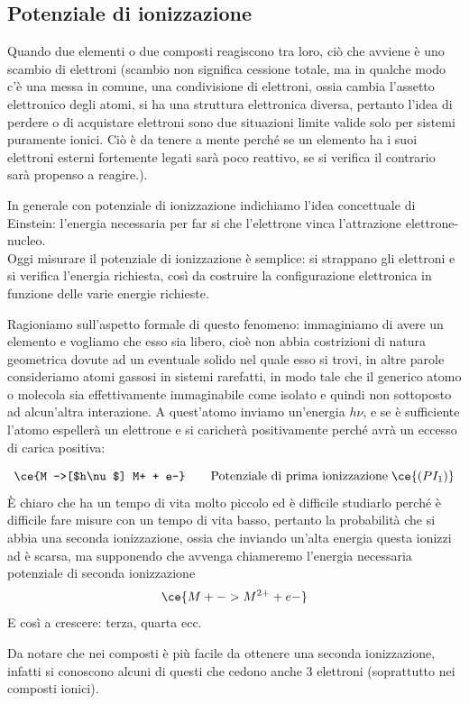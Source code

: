 \subsection{Potenziale di ionizzazione}
Quando due elementi o due composti reagiscono tra loro, ciò che avviene è uno scambio di elettroni (scambio non significa cessione totale, ma in qualche modo c'è una messa in comune, una condivisione di elettroni, ossia cambia l'assetto elettronico degli atomi, si ha una struttura elettronica diversa, pertanto l'idea di perdere o di acquistare elettroni sono due situazioni limite valide solo per sistemi puramente ionici. Ciò è da tenere a mente perché se un elemento ha i suoi elettroni esterni fortemente legati sarà poco reattivo, se si verifica il contrario sarà propenso a reagire.).

In generale con potenziale di ionizzazione indichiamo l'idea concettuale di Einstein: l'energia necessaria per far si che l'elettrone vinca l'attrazione elettrone-nucleo.\\

Oggi misurare il potenziale di ionizzazione è semplice: si strappano gli elettroni e si verifica l'energia richiesta, così da costruire la configurazione elettronica in funzione delle varie energie richieste.

Ragioniamo sull'aspetto formale di questo fenomeno: immaginiamo di avere un elemento e vogliamo che esso sia libero, cioè non abbia costrizioni di natura geometrica dovute ad un eventuale solido nel quale esso si trovi, in altre parole consideriamo atomi gassosi in sistemi rarefatti, in modo tale che il generico atomo o molecola sia effettivamente immaginabile come isolato e quindi non sottoposto ad alcun'altra interazione. A quest'atomo inviamo un'energia $h\nu$, e se è sufficiente l'atomo espellerà un elettrone e si caricherà positivamente perché avrà un eccesso di carica positiva:

$$\ce{M ->[$h\nu$] M+ + e-} \qquad \text{Potenziale di prima ionizzazione} \; \ce{(PI_1)}$$
È chiaro che  ha un tempo di vita molto piccolo ed è difficile studiarlo perché è difficile fare misure con un tempo di vita basso, pertanto la probabilità che si abbia una seconda ionizzazione, ossia che inviando un'alta energia questa ionizzi  ad  è scarsa, ma supponendo che avvenga chiameremo l'energia necessaria potenziale di seconda ionizzazione 
$$\ce{M+ -> M^{2+} + e-}$$
E così a crescere: terza, quarta ecc.

Da notare che nei composti è più facile da ottenere una seconda ionizzazione, infatti si conoscono alcuni di questi che cedono anche 3 elettroni (soprattutto nei composti ionici).

